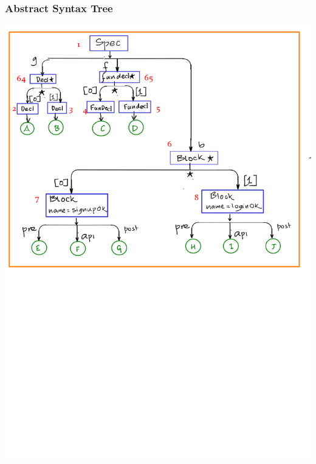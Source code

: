 \documentclass[12pts, a4paper]{article}
\begin{document}
\subsubsection{Abstract Syntax Tree}
\begin{center}
\includegraphics[width=\textwidth]{../images/spec-AST-2.png}


\end{center}
\end{document}
